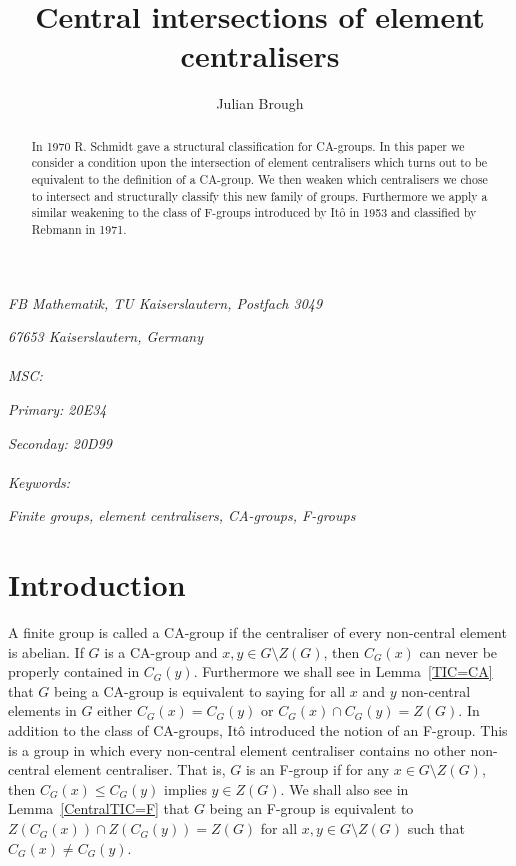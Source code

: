 \documentclass[a4paper,11pt]{article}
\title{Central intersections of element centralisers}
\author{Julian Brough}
\theoremstyle{plain}
\numberwithin{thm}{section}
\begin{document}
\date{}
\maketitle

\vspace{-3mm}

\begin{center}
\small
\textit{FB Mathematik, TU Kaiserslautern, Postfach 3049}

\textit{67653 Kaiserslautern, Germany}

\end{center}

\paragraph{}
  \textit{MSC:}

\textit{Primary: 20E34}

\textit{Seconday: 20D99}


\paragraph{}
  \textit{Keywords:}

\textit{Finite groups, element centralisers, CA-groups, F-groups}

\normalsize
\begin{abstract}
In 1970 R. Schmidt gave a structural classification for CA-groups.
In this paper we consider a condition upon the intersection of element centralisers which turns out to be equivalent to the definition of a CA-group.
We then weaken which centralisers we chose to intersect and structurally classify this new family of groups.
Furthermore we apply a similar weakening to the class of F-groups introduced by It{\^o} in 1953 and classified by Rebmann in 1971.
 
\end{abstract}

\section{Introduction}

A finite group is called a CA-group if the centraliser of every non-central element is abelian.
If $G$ is a CA-group and $x,y\in G\setminus Z(G)$, then $C_G(x)$ can never be properly contained in $C_G(y)$.
Furthermore we shall see in Lemma~\ref{TIC=CA} that $G$ being a CA-group is equivalent to saying for all $x$ and $y$ non-central elements in $G$ either $C_G(x)=C_G(y)$ or $C_G(x)\cap C_G(y)=Z(G)$.
In addition to the class of CA-groups, It{\^o} \cite{ItoTypeI} introduced the notion of an F-group.
This is a group in which every non-central element centraliser contains no other non-central element centraliser.
That is, $G$ is an F-group if for any $x\in G\setminus Z(G)$, then $C_G(x)\leq C_G(y)$ implies $y\in Z(G)$.
We shall also see in Lemma~\ref{CentralTIC=F} that $G$ being an F-group is equivalent to $Z(C_G(x))\cap Z(C_G(y))=Z(G)$ for all $x,y\in G\setminus Z(G)$ such that $C_G(x)\ne C_G(y)$. 
\end{document}
